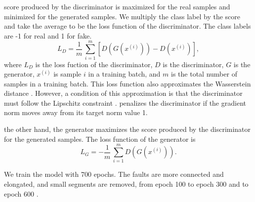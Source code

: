 score produced by the discriminator is maximized for the real samples and minimized for the generated samples. We multiply the class label by the score and take the average to be the loss function of the discriminator. The class labels are -1 for real and 1 for fake.
\begin{equation}
	L_D = \frac{1}{m}\,\sum_{i=1}^{m} \left[D(G(x^{(i)})) - D(x^{(i)})\right],
\end{equation}	
where $L_D$ is the loss fuction of the discriminator, $D$ is the discriminator, $G$ is the generator, $x^{(i)}$ is sample $i$ in a training batch, and $m$ is the total number of samples in a training batch. This loss function also approximates the Wasserstein distance \cite[]{kr1958,arjovsky2017}. However, a condition of this approximation is that the discriminator must follow the Lipschitz constraint \cite[]{kr1958}. \cite{gulrajani2017} penalizes the discriminator if the gradient norm moves away from its target norm value 1.   

 the other hand, the generator maximizes the score produced by the discriminator for the generated samples. The loss function of the generator is 
\begin{equation}
        L_G = -\frac{1}{m}\,\sum_{i=1}^{m} D(G(x^{(i)})).
\end{equation}

We train the model with 700 epochs.  The faults are more connected and elongated, and small segments are removed, from epoch 100 to epoch 300 and to epoch 600 . 

